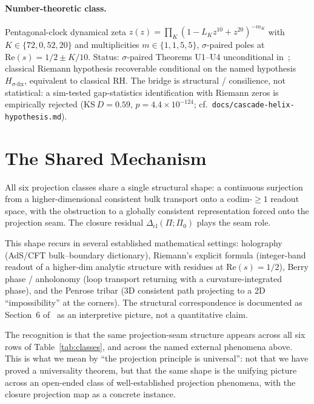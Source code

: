 \documentclass[12pt]{article}
\newcommand{\Dcl}{\Delta_{\mathrm{cl}}}
\begin{document}
\paragraph{Number-theoretic class.} Pentagonal-clock dynamical zeta $\hat z(z) = \prod_K (1 - L_K z^{10} + z^{20})^{-m_K}$ with $K \in \{72, 0, 52, 20\}$ and multiplicities $m \in \{1, 1, 5, 5\}$, $\sigma$-paired poles at $\mathrm{Re}(s) = 1/2 \pm K/10$. Status: $\sigma$-paired Theorems U1--U4 unconditional in~\citep{SmartRHFormal}; classical Riemann hypothesis recoverable conditional on the named hypothesis $H_{\sigma\text{-fix}}$, equivalent to classical RH. The bridge is structural / consilience, not statistical: a sim-tested gap-statistics identification with Riemann zeros is empirically rejected ($\mathrm{KS}\ D = 0.59$, $p = 4.4\times 10^{-124}$; cf.\ \texttt{docs/cascade-helix-hypothesis.md}).

\section{The Shared Mechanism}\label{sec:mechanism}

All six projection classes share a single structural shape: a continuous surjection from a higher-dimensional consistent bulk transport onto a codim-$\geq 1$ readout space, with the obstruction to a globally consistent representation forced onto the projection seam. The closure residual $\Dcl(\Pi; \Pi_0)$ plays the seam role.

This shape recurs in several established mathematical settings: holography (AdS/CFT bulk--boundary dictionary), Riemann's explicit formula (integer-band readout of a higher-dim analytic structure with residues at $\mathrm{Re}(s) = 1/2$), Berry phase / anholonomy (loop transport returning with a curvature-integrated phase), and the Penrose tribar (3D consistent path projecting to a 2D ``impossibility'' at the corners). The structural correspondence is documented as Section~6 of~\citep{SmartXXXIII} as an interpretive picture, not a quantitative claim.

The recognition is that the same projection-seam structure appears across all six rows of Table~\ref{tab:classes}, and across the named external phenomena above. This is what we mean by ``the projection principle is universal'': not that we have proved a universality theorem, but that the same shape is the unifying picture across an open-ended class of well-established projection phenomena, with the closure projection map as a concrete instance.
\end{document}
